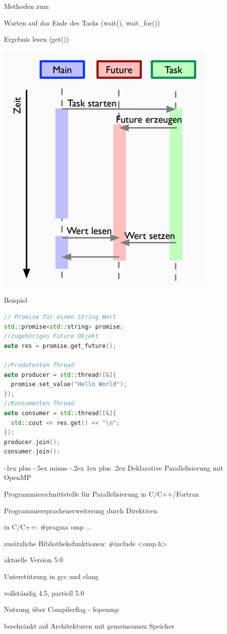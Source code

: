 \documentclass[10pt]{article}
\makeatletter
\renewcommand{\subsubsection}{\@startsection{subsubsection}{3}{0mm}%
                                {-1ex plus -.5ex minus -.2ex}%
                                {1ex plus .2ex}%
                                {\normalfont\small\bfseries}}
\makeatother
\begin{document}
\begin{itemize*}
  \item Methoden zum
  \begin{itemize*}
    \item Warten auf das Ende des Tasks (wait(), wait\_for())
    \item Ergebnis lesen (get())
  \end{itemize*}
\end{itemize*}
\begin{center}
  \includegraphics[width=0.4\linewidth]{Assets/Programmierparadigmen-future-task}
\end{center}

Beispiel
\begin{lstlisting}[language=C++]
// Promise für einen String Wert
std::promise<std::string> promise;
//zugehöriges Future Objekt
auto res = promise.get_future();

//Produtenten Thread
auto producer = std::thread([&]{
  promise.set_value("Hello World");
});
//Konsumenten Thread
auto consumer = std::thread([&]{
  std::cout << res.get() << "\n";
});
producer.join();
consumer.join();
\end{lstlisting}

\subsubsection{Deklarative Parallelisierung mit OpenMP}
\begin{itemize*}
  \item Programmierschnittstelle für Parallelisierung in C/C++/Fortran
  \item Programmiersprachenerweiterung durch Direktiven
  \item in C/C++: \#pragma omp ...
  \item zusätzliche Bibliotheksfunktionen: \#include <omp.h>
  \item aktuelle Version 5.0
  \item Unterstützung in gcc und clang
  \begin{itemize*}
    \item vollständig 4.5, partiell 5.0
    \item Nutzung über Compilerflag - fopenmp
  \end{itemize*}
  \item beschränkt auf Architekturen mit gemeinsamen Speicher
\end{itemize*}
\end{document}
